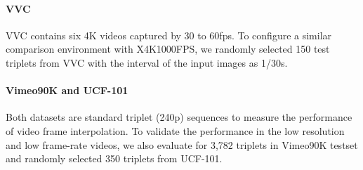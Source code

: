 \documentclass[10pt,twocolumn,letterpaper]{article}
\begin{document}
\paragraph{VVC} 
VVC contains six 4K videos captured by 30 to 60fps. 
To configure a similar comparison environment with X4K1000FPS, we randomly selected 150 test triplets from VVC with the interval of the input images as 1/30s.

\paragraph{Vimeo90K and UCF-101~\cite{soomro2012ucf101, xue2019video}} Both datasets are standard triplet (240p) sequences to measure the performance of video frame interpolation. 
To validate the performance in the low resolution and low frame-rate videos, we also evaluate for 3,782 triplets in Vimeo90K testset and randomly selected 350 triplets from UCF-101.
\end{document}

